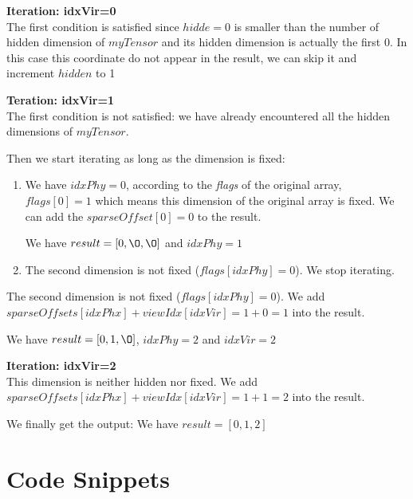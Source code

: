 	\textbf{Iteration: idxVir=0}\\
	The first condition is satisfied since $hidde=0$ is smaller than the number of hidden dimension of $myTensor$ and its hidden dimension is actually the first 0. In this case this coordinate do not appear in the result, we can skip it and increment $hidden$ to 1
	
	\textbf{Teration: idxVir=1}\\
	The first condition is not satisfied: we have already encountered all the hidden dimensions of $myTensor$.
	
	Then we start iterating as long as the dimension is fixed:
	\begin{enumerate}
		\item  We have $idxPhy=0$, according to the \textit{flags} of the original array, $flags[0] = 1$ which means this dimension of the original array is fixed. We can add the $sparseOffset[0] = 0$ to the result.
		
		We have $result = [0, \O, \O]$ and $idxPhy=1$
		
		\item The second dimension is not fixed ($flags[idxPhy] = 0$). We stop iterating.
	\end{enumerate}
	
	The second dimension is not fixed ($flags[idxPhy] = 0$).  We add $sparseOffsets[idxPhx] + viewIdx[idxVir] = 1 + 0 =  1$ into the result.
	
	We have $result = [0, 1, \O]$, $idxPhy=2$ and $idxVir=2$
	
	\textbf{Iteration: idxVir=2}\\
	This dimension is neither hidden nor fixed. We add $sparseOffsets[idxPhx] + viewIdx[idxVir] = 1 + 1 =  2$ into the result.
	
	We finally get the output: We have $result = [0, 1, 2]$
	
\section{Code Snippets}

\label{ch:codesnip}

